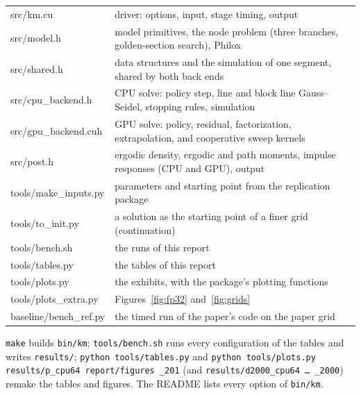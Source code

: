 \documentclass[11pt]{article}
\begin{document}
\begin{tabular}{@{}>{\ttfamily}l p{}@{}}
\toprule
src/km.cu & driver: options, input, stage timing, output \\
src/model.h & model primitives, the node problem (three branches, golden-section search), Philox \\
src/shared.h & data structures and the simulation of one segment, shared by both back ends \\
src/cpu\_backend.h & CPU solve: policy step, line and block line Gauss--Seidel, stopping rules, simulation \\
src/gpu\_backend.cuh & GPU solve: policy, residual, factorization, extrapolation, and cooperative sweep kernels \\
src/post.h & ergodic density, ergodic and path moments, impulse responses (CPU and GPU), output \\
tools/make\_inputs.py & parameters and starting point from the replication package \\
tools/to\_init.py & a solution as the starting point of a finer grid (continuation) \\
tools/bench.sh & the runs of this report \\
tools/tables.py & the tables of this report \\
tools/plots.py & the exhibits, with the package's plotting functions \\
tools/plots\_extra.py & Figures~\ref{fig:fp32} and~\ref{fig:grids} \\
baseline/bench\_ref.py & the timed run of the paper's code on the paper grid \\
\bottomrule
\end{tabular}

\medskip
\noindent \texttt{make} builds \texttt{bin/km}; \texttt{tools/bench.sh} runs every configuration of the tables and writes \texttt{results/}; \texttt{python tools/tables.py} and \texttt{python tools/plots.py results/p\_cpu64 report/figures \_201} (and \texttt{results/d2000\_cpu64 \ldots\ \_2000}) remake the tables and figures. The README lists every option of \texttt{bin/km}.
\end{document}
